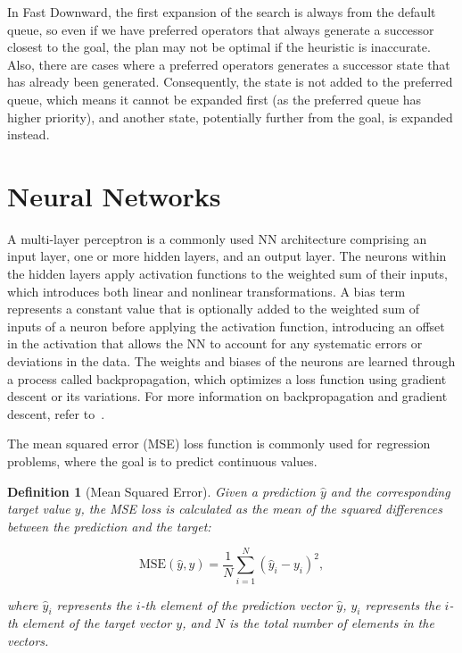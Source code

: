 \documentclass[ppgc,diss,english]{iiufrgs}
\newtheorem{definition}{Definition}
\begin{document}
In Fast Downward, the first expansion of the search is always from the default queue, so even if we have preferred operators that always generate a successor closest to the goal, the plan may not be optimal if the heuristic is inaccurate. Also, there are cases where a preferred operators generates a successor state that has already been generated. Consequently, the state is not added to the preferred queue, which means it cannot be expanded first (as the preferred queue has higher priority), and another state, potentially further from the goal, is expanded instead.

\section{Neural Networks}
\label{sec:background-neural-nets}

A multi-layer perceptron is a commonly used NN architecture comprising an input layer, one or more hidden layers, and an output layer. The neurons within the hidden layers apply activation functions to the weighted sum of their inputs, which introduces both linear and nonlinear transformations. A bias term represents a constant value that is optionally added to the weighted sum of inputs of a neuron before applying the activation function, introducing an offset in the activation that allows the NN to account for any systematic errors or deviations in the data. The weights and biases of the neurons are learned through a process called backpropagation, which optimizes a loss function using gradient descent or its variations. For more information on backpropagation and gradient descent, refer to~\citet{Goodfellow.etal/2016}.

The mean squared error (MSE) loss function is commonly used for regression problems, where the goal is to predict continuous values.
\begin{definition}[Mean Squared Error]\label{def:mse}
Given a prediction $\hat{y}$ and the corresponding target value $y$, the MSE loss is calculated as the mean of the squared differences between the prediction and the target:

$$\text{MSE}(\hat{y}, y) = \frac{1}{N} \sum_{i=1}^{N} (\hat{y}_i - y_i)^2,$$

where $\hat{y}_i$ represents the $i$-th element of the prediction vector $\hat{y}$, $y_i$ represents the $i$-th element of the target vector $y$, and $N$ is the total number of elements in the vectors.
\end{definition}
\end{document}
